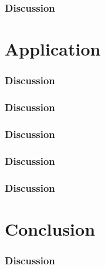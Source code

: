 \documentclass[9pt]{beamer}
\begin{document}
\begin{frame}
	\frametitle{Discussion}

\end{frame}


\section{Application}
\begin{frame}
	\frametitle{Discussion}

\end{frame}

\begin{frame}
	\frametitle{Discussion}

\end{frame}

\begin{frame}
	\frametitle{Discussion}

\end{frame}

\begin{frame}
	\frametitle{Discussion}

\end{frame}

\begin{frame}
	\frametitle{Discussion}

\end{frame}

\section{Conclusion}
\begin{frame}
	\frametitle{Discussion}

\end{frame}
\end{document}
